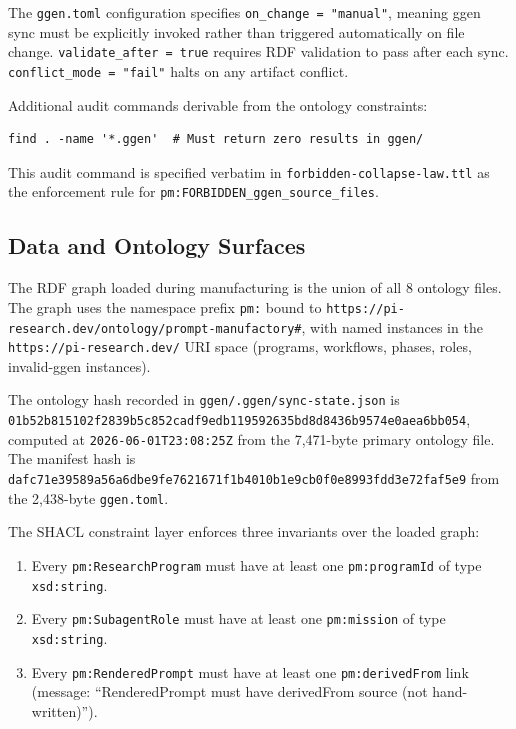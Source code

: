 The \texttt{ggen.toml} configuration specifies \texttt{on\_change = "manual"}, meaning
ggen sync must be explicitly invoked rather than triggered automatically on file change.
\texttt{validate\_after = true} requires RDF validation to pass after each sync.
\texttt{conflict\_mode = "fail"} halts on any artifact conflict.

Additional audit commands derivable from the ontology constraints:
\begin{verbatim}
find . -name '*.ggen'  # Must return zero results in ggen/
\end{verbatim}

This audit command is specified verbatim in \texttt{forbidden-collapse-law.ttl} as the
enforcement rule for \texttt{pm:FORBIDDEN\_ggen\_source\_files}.

\subsection{Data and Ontology Surfaces}
\label{sec:research-prompt-manufactory-implementation-data}

The RDF graph loaded during manufacturing is the union of all 8 ontology files. The
graph uses the namespace prefix \texttt{pm:} bound to
\texttt{https://pi-research.dev/ontology/prompt-manufactory\#}, with named instances
in the \texttt{https://pi-research.dev/} URI space (programs, workflows, phases, roles,
invalid-ggen instances).

The ontology hash recorded in \texttt{ggen/.ggen/sync-state.json} is
\texttt{01b52b815102f2839b5c852cadf9edb119592635bd8d8436b9574e0aea6bb054}, computed
at \texttt{2026-06-01T23:08:25Z} from the 7,471-byte primary ontology file. The manifest
hash is \texttt{dafc71e39589a56a6dbe9fe7621671f1b4010b1e9cb0f0e8993fdd3e72faf5e9}
from the 2,438-byte \texttt{ggen.toml}.

The SHACL constraint layer enforces three invariants over the loaded graph:
\begin{enumerate}
  \item Every \texttt{pm:ResearchProgram} must have at least one \texttt{pm:programId}
    of type \texttt{xsd:string}.
  \item Every \texttt{pm:SubagentRole} must have at least one \texttt{pm:mission}
    of type \texttt{xsd:string}.
  \item Every \texttt{pm:RenderedPrompt} must have at least one \texttt{pm:derivedFrom}
    link (message: ``RenderedPrompt must have derivedFrom source (not hand-written)'').
\end{enumerate}

